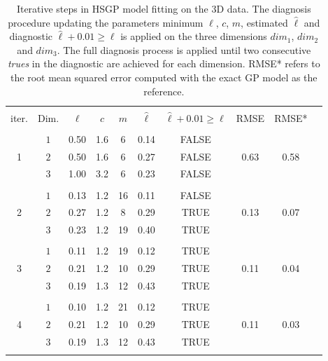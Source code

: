 \begin{table}
\centering
\setlength{\tabcolsep}{3.6pt}
\begin{tabular}{cccccccccc}
\arrayrulecolor{gray}\hline \\[-3mm]
 iter. & Dim. & $\ell$ & $c$ & $m$ & $\hat{\ell}$ & $\hat{\ell} + 0.01 \geq \ell$ & RMSE & RMSE* \\ 
\arrayrulecolor{lightgray}\hline \\[-2mm]
 \multirow{3}{*}{ 1 } & $1$ & 0.50 & 1.6 & 6 & 0.14 & FALSE & \multirow{3}{*}{ 0.63 } & \multirow{3}{*}{ 0.58 }\\ 
 & $2$ & 0.50 & 1.6 & 6 & 0.27 & FALSE &  &  \\
 & $3$ & 1.00 & 3.2 & 6 & 0.23 & FALSE &  &  \\
\arrayrulecolor{lightgray}\hline \\[-2mm]
 \multirow{3}{*}{ 2 } & $1$ & 0.13 & 1.2 & 16 & 0.11 & FALSE  & \multirow{3}{*}{ 0.13 } & \multirow{3}{*}{ 0.07 }\\
 & $2$ & 0.27 & 1.2 & 8 & 0.29 & TRUE &  &  \\
 & $3$ & 0.23 & 1.2 & 19 & 0.40 & TRUE &  &  \\
\arrayrulecolor{lightgray}\hline \\[-2mm]
 \multirow{3}{*}{ 3 } & $1$ & 0.11 & 1.2 & 19 & 0.12 & TRUE  & \multirow{3}{*}{ 0.11 } & \multirow{3}{*}{ 0.04 }\\
 & $2$ & 0.21 & 1.2 & 10 & 0.29 & TRUE &  &  \\
 & $3$ & 0.19 & 1.3 & 12 & 0.43 & TRUE &  &  \\
 \arrayrulecolor{lightgray}\hline \\[-2mm]
 \multirow{3}{*}{ 4 } & $1$ & 0.10 & 1.2 & 21 & 0.12 & TRUE  & \multirow{3}{*}{ 0.11 } & \multirow{3}{*}{ 0.03 }\\
 & $2$ & 0.21 & 1.2 & 10 & 0.29 & TRUE &  &  \\
 & $3$ & 0.19 & 1.3 & 12 & 0.43 & TRUE &  &  \\[1mm] 
\arrayrulecolor{lightgray}\hline
 \multicolumn{9}{l}{ $\ell_{1_{GP}}=0.11$, \,$\ell_{2_{GP}}=0.32$, \, $\ell_{3_{GP}}=0.43$ }
\end{tabular}
\caption{Iterative steps in HSGP model fitting on the $3$D data. The diagnosis procedure updating the parameters minimum $\ell$, $c$, $m$, estimated $\hat{\ell}$ and diagnostic $\hat{\ell} + 0.01 \geq \ell$ is applied on the three dimensions $dim_1$, $dim_2$ and $dim_3$. The full diagnosis process is applied until two consecutive \textit{trues} in the diagnostic are achieved for each dimension. RMSE* refers to the root mean squared error computed with the exact GP model as the reference.}
  \label{tab_caseIII_3D}
\end{table}


